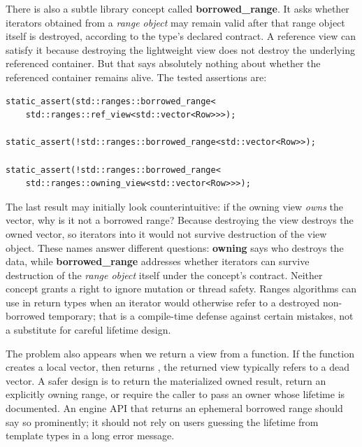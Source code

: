 There is also a subtle library concept called \textbf{borrowed\_range}. It asks whether iterators obtained from a \emph{range object} may remain valid after that range object itself is destroyed, according to the type's declared contract. A reference view can satisfy it because destroying the lightweight view does not destroy the underlying referenced container. But that says absolutely nothing about whether the referenced container remains alive. The tested assertions are:

\begin{verbatim}
static_assert(std::ranges::borrowed_range<
    std::ranges::ref_view<std::vector<Row>>>);

static_assert(!std::ranges::borrowed_range<std::vector<Row>>);

static_assert(!std::ranges::borrowed_range<
    std::ranges::owning_view<std::vector<Row>>>);
\end{verbatim}

The last result may initially look counterintuitive: if the owning view \emph{owns} the vector, why is it not a borrowed range? Because destroying the view destroys the owned vector, so iterators into it would not survive destruction of the view object. These names answer different questions: \textbf{owning} says who destroys the data, while \textbf{borrowed\_range} addresses whether iterators can survive destruction of the \emph{range object} itself under the concept's contract. Neither concept grants a right to ignore mutation or thread safety. Ranges algorithms can use  in return types when an iterator would otherwise refer to a destroyed non-borrowed temporary; that is a compile-time defense against certain mistakes, not a substitute for careful lifetime design.

The problem also appears when we return a view from a function. If the function creates a local vector, then returns , the returned view typically refers to a dead vector. A safer design is to return the materialized owned result, return an explicitly owning range, or require the caller to pass an owner whose lifetime is documented. An engine API that returns an ephemeral borrowed range should say so prominently; it should not rely on users guessing the lifetime from template types in a long error message.

